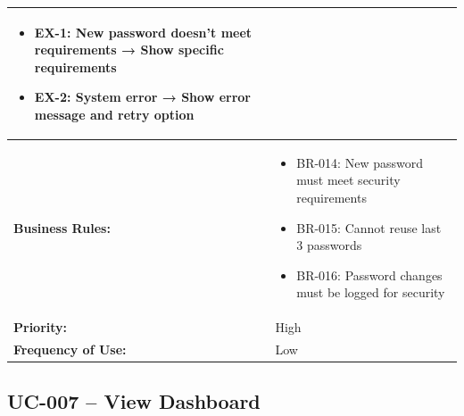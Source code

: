 \documentclass[12pt,a4paper]{article}
\begin{document}
\begin{longtable}{|p{4.5cm}|p{10.5cm}|}
\begin{itemize}
  \item EX-1: New password doesn't meet requirements → Show specific requirements
  \item EX-2: System error → Show error message and retry option
\end{itemize} \\
\hline
\textbf{Business Rules:} &
\begin{itemize}
  \item BR-014: New password must meet security requirements
  \item BR-015: Cannot reuse last 3 passwords
  \item BR-016: Password changes must be logged for security
\end{itemize} \\
\hline
\textbf{Priority:} & High \\
\hline
\textbf{Frequency of Use:} & Low \\
\hline
\end{longtable}

\subsection{UC-007 – View Dashboard}
\end{document}
